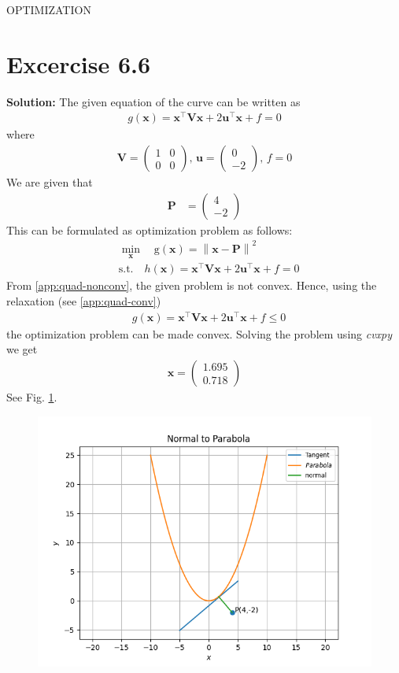 \documentclass[12pt]{article}
\providecommand{\brak}[1]{\ensuremath{\left(#1\right)}}
\providecommand{\norm}[1]{\left\lVert#1\right\rVert}
\newcommand{\solution}{\noindent \textbf{Solution: }}
\newcommand{\myvec}[1]{\ensuremath{\begin{pmatrix}#1\end{pmatrix}}}
\let\vec\mathbf
\begin{document}
\begin{center}
\textbf\large{OPTIMIZATION}

\end{center}
\section*{Excercise 6.6}


\solution
\fi
The given equation of the curve can be written as  
\begin{align}
	\label{eq:12/6/6/4/conv/parabolaEq2}
	g\brak{\vec{x}} = \vec{x}^\top\vec{V}\vec{x} + 2\vec{u}^\top\vec{x} + f = 0 
\end{align}
where
\begin{align}
	\vec{V} = \myvec{ 1 & 0 \\ 0 & 0} ,\,
	\vec{u} = \myvec{0 \\ -2} ,\,
	f = 0 
\end{align}
We are given that 
\begin{align}
	\vec{P} &= \myvec{4 \\ -2}
\end{align}
This can be formulated as optimization problem as follows:
\begin{align}
	\label{eq:12/6/6/4/conv/Eq3}
	&  \min_{\vec{x}} \quad \text{g}\brak{\vec{x}} = \norm{\vec{x}-\vec{P}}^2\\
	\label{eq:12/6/6/4/conv/Eq4}
	& \text{s.t.}\quad h\brak{\vec{x}} = \vec{x}^\top\vec{V}\vec{x} + 2\vec{u}^\top\vec{x} + f = 0  
\end{align}
From 
	    \ref{app:quad-nonconv}, the
given problem is not convex. Hence, using the relaxation (see 
	    \ref{app:quad-conv})
\begin{align}
	\label{eq:12/6/6/4/conv/Eq7}
	& g\brak{\vec{x}} = \vec{x}^\top\vec{V}\vec{x} + 2\vec{u}^\top\vec{x} + f \le 0  
\end{align}
the optimization problem can be made convex.  Solving the problem using \textit{cvxpy} we get 
\begin{align}
	\vec{x} = \myvec{1.695\\0.718}
\end{align}
See Fig. \ref{fig:12/6/6/4/conv/Fig1}.
\begin{figure}[!h]
	\begin{center} 
	    \includegraphics[width=\columnwidth]{12/6/6/4/conv/figs/12_6_6_4}
	\end{center}
\caption{}
\label{fig:12/6/6/4/conv/Fig1}
\end{figure}
\end{document}
